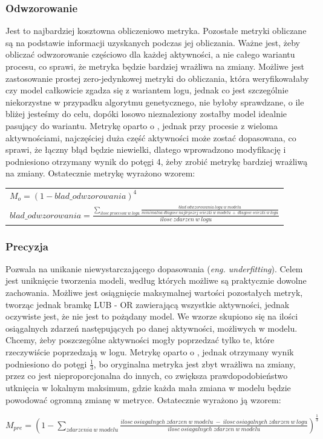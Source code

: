 \subsubsection{Odwzorowanie} 
Jest to najbardziej kosztowna obliczeniowo metryka. Pozostałe metryki obliczane są na podstawie informacji uzyskanych podczas jej obliczania. Ważne jest, żeby obliczać odwzorowanie częściowo dla każdej aktywności, a nie całego wariantu procesu, co sprawi, że metryka będzie bardziej wrażliwa na zmiany. Możliwe jest zastosowanie prostej zero-jedynkowej metryki do obliczania, która weryfikowałaby czy model całkowicie zgadza się z wariantem logu, jednak co jest szczególnie niekorzystne w przypadku algorytmu genetycznego, nie byłoby sprawdzane, o ile bliżej jesteśmy do celu, dopóki losowo nieznaleziony zostałby model idealnie pasujący do wariantu. Metrykę oparto o \cite{metric-calculation}, jednak przy procesie z wieloma aktywnościami, najczęściej duża część aktywności może zostać dopasowana, co sprawi, że łączny błąd będzie niewielki, dlatego wprowadzono modyfikację i podniesiono otrzymany wynik do potęgi 4, żeby zrobić metrykę bardziej wrażliwą na zmiany. Ostatecznie metrykę wyrażono wzorem:
\begin{center}
\begin{tabular}{l}
$M_o = (1 - blad\_odwzorowania)^4$ \\
$blad\_odwzorowania = \frac{\sum_{ilosc\ procesow\ w\ logu} \frac{blad\ odwzorowania\ logu\ w\ modelu}{minimalna\ długosc\ najlepszej\ sciezki\ w\ modelu\ +\ długosc\ sciezki\ w\ logu}}{ilosc\ zdarzen \ w\ logu}$
\end{tabular}
\end{center}
\subsubsection{Precyzja} 
Pozwala na unikanie niewystarczającego dopasowania (\textit{eng. underfitting}). Celem jest uniknięcie tworzenia modeli, według których możliwe są praktycznie dowolne zachowania. Możliwe jest osiągnięcie maksymalnej wartości pozostałych metryk, tworząc jednak bramkę LUB - OR zawierającą wszystkie aktywności, jednak oczywiste jest, że nie jest to pożądany model. We wzorze skupiono się na ilości osiągalnych zdarzeń następujących po danej aktywności, możliwych w modelu. Chcemy, żeby poszczególne aktywności mogły poprzedzać tylko te, które rzeczywiście poprzedzają w logu. Metrykę oparto o \cite{precision-calculation}, jednak otrzymany wynik podniesiono do potęgi $\frac{1}{3}$, bo oryginalna metryka jest zbyt wrażliwa na zmiany, przez co jest nieproporcjonalna do innych, co zwiększa prawdopodobieństwo utknięcia w lokalnym maksimum, gdzie każda mała zmiana w modelu będzie powodować ogromną zmianę w metryce. Ostatecznie wyrażono ją wzorem:
\begin{center}
$M_{pre} = (1 - \sum_{zdarzenia\ w\ modelu} \frac{ilosc\ osiagalnych\ zdarzen\ w\ modelu\ -\ ilosc\ osiagalnych\ zdarzen\ w\ logu}{ilosc\ osiagalnych\ zdarzen\ w\ modelu})^{\frac{1}{3}} $
\end{center}
